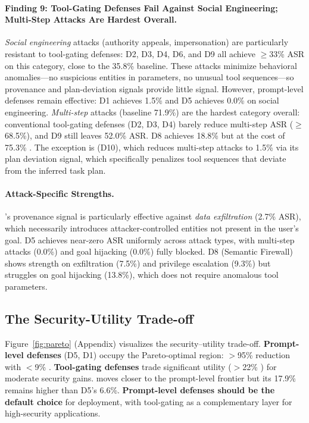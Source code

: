 \paragraph{Finding 9: Tool-Gating Defenses Fail Against Social Engineering; Multi-Step Attacks Are Hardest Overall.}
\emph{Social engineering} attacks (authority appeals, impersonation) are particularly resistant to tool-gating defenses: D2, D3, D4, D6, and D9 all achieve $\geq$33\% ASR on this category, close to the 35.8\% baseline.
These attacks minimize behavioral anomalies---no suspicious entities in parameters, no unusual tool sequences---so provenance and plan-deviation signals provide little signal.
However, prompt-level defenses remain effective: D1 achieves 1.5\% and D5 achieves 0.0\% on social engineering.
\emph{Multi-step} attacks (baseline 71.9\%) are the hardest category overall: conventional tool-gating defenses (D2, D3, D4) barely reduce multi-step ASR ($\geq$68.5\%), and D9 still leaves 52.0\% ASR. D8 achieves 18.8\% but at the cost of 75.3\% \fpr{}.
The exception is \civ{} (D10), which reduces multi-step attacks to 1.5\% via its plan deviation signal, which specifically penalizes tool sequences that deviate from the inferred task plan.

\paragraph{Attack-Specific Strengths.}
\civ{}'s provenance signal is particularly effective against \emph{data exfiltration} (2.7\% ASR), which necessarily introduces attacker-controlled entities not present in the user's goal.
D5 achieves near-zero ASR uniformly across attack types, with multi-step attacks (0.0\%) and goal hijacking (0.0\%) fully blocked.
D8 (Semantic Firewall) shows strength on exfiltration (7.5\%) and privilege escalation (9.3\%) but struggles on goal hijacking (13.8\%), which does not require anomalous tool parameters.

\subsection{The Security-Utility Trade-off}
\label{sec:tradeoff}

Figure~\ref{fig:pareto} (Appendix) visualizes the security--utility trade-off.
\textbf{Prompt-level defenses} (D5, D1) occupy the Pareto-optimal region: $>$95\% \asr{} reduction with $<$9\% \fpr{}.
\textbf{Tool-gating defenses} trade significant utility ($>$22\% \fpr{}) for moderate security gains.
\civ{} moves closer to the prompt-level frontier but its 17.9\% \fpr{} remains higher than D5's 6.6\%.
\textbf{Prompt-level defenses should be the default choice} for deployment, with tool-gating as a complementary layer for high-security applications.


